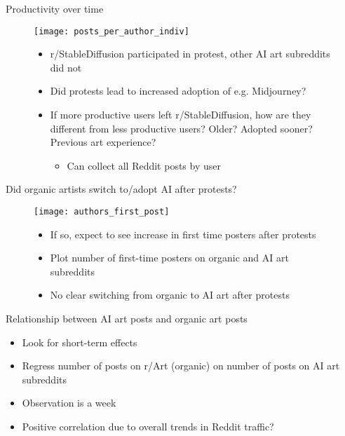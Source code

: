 \documentclass[aspectratio=169]{beamer}
\def\defaultscalefig{0.4}
\begin{document}
\begin{frame}{Productivity over time}
	\begin{figure}
		\begin{minipage}{0.45\textwidth}
			\centering
			\texttt{[image: posts\_per\_author\_indiv]}
		\end{minipage}\hfill
		\begin{minipage}{0.45\textwidth}
			\centering
			\begin{itemize}
				\item r/StableDiffusion participated in protest,
					other AI art subreddits did not
				\item Did protests lead to increased adoption of e.g. Midjourney?
				\item If more productive users left r/StableDiffusion,
					how are they different from less productive users?
					Older? Adopted sooner? Previous art experience?
					\begin{itemize}
						\item Can collect all Reddit posts by user
					\end{itemize}
			\end{itemize}
		\end{minipage}
	\end{figure}
\end{frame}

\begin{frame}{Did organic artists switch to/adopt AI after protests?}
	\begin{figure}
		\begin{minipage}{0.45\textwidth}
			\centering
			\texttt{[image: authors\_first\_post]}
		\end{minipage}\hfill
		\begin{minipage}{0.45\textwidth}
			\centering
			\begin{itemize}
				\item If so, expect to see increase in first time posters after protests
				\item Plot number of first-time posters on organic and AI art subreddits
				\item No clear switching from organic to AI art after protests
			\end{itemize}
		\end{minipage}
	\end{figure}
\end{frame}

\begin{frame}{Relationship between AI art posts and organic art posts}
	\centering
	\resizebox*{!}{4cm}{
		
	}
	\begin{itemize}
		\item Look for short-term effects
		\item Regress number of posts on r/Art (organic) on number of posts on AI art subreddits
		\item Observation is a week
		\item Positive correlation due to overall trends in Reddit traffic?
	\end{itemize}
\end{frame}
\end{document}
